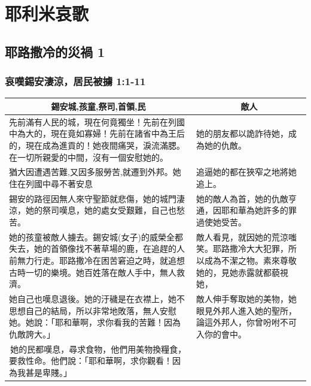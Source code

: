 \chapter{耶利米哀歌}

\section{耶路撒冷的災禍 1}
\subsection{哀嘆錫安淒涼，居民被擄 1:1-11}

\begin{table}[H]
\centering
\begin{tabular}{p{}|p{6.25cm}}\hline\hline
\multicolumn{1}{c|}{錫安城,孩童,祭司,首領,民}&\multicolumn{1}{c}{敵人}\\\hline
先前滿有人民的城，現在何竟獨坐！先前在列國中為大的，現在竟如寡婦！先前在諸省中為王后的，現在成為進貢的！她夜間痛哭，淚流滿腮。在一切所親愛的中間，沒有一個安慰她的。
&她的朋友都以詭詐待她，成為她的仇敵。\\\hline

猶大因遭遇苦難,又因多服勞苦,就遷到外邦。她住在列國中尋不著安息
&追逼她的都在狹窄之地將她追上。\\\hline

錫安的路徑因無人來守聖節就悲傷，她的城門淒涼，她的祭司嘆息，她的處女受艱難，自己也愁苦。
&她的敵人為首，她的仇敵亨通，因耶和華為她許多的罪過使她受苦。\\\hline

她的孩童被敵人擄去。錫安城(女子)的威榮全都失去，她的首領像找不著草場的鹿，在追趕的人前無力行走。耶路撒冷在困苦窘迫之時，就追想古時一切的樂境。她百姓落在敵人手中，無人救濟。
&敵人看見，就因她的荒涼嗤笑。耶路撒冷大大犯罪，所以成為不潔之物。素來尊敬她的，見她赤露就都藐視她，\\\hline

她自己也嘆息退後。她的汙穢是在衣襟上，她不思想自己的結局，所以非常地敗落，無人安慰她。她說：「耶和華啊，求你看我的苦難！因為仇敵誇大。」&敵人伸手奪取她的美物，她眼見外邦人進入她的聖所，論這外邦人，你曾吩咐不可入你的會中。 \\\hline

 她的民都嘆息，尋求食物，他們用美物換糧食，要救性命。他們說：「耶和華啊，求你觀看！因為我甚是卑賤。」&\\\hline
\end{tabular}
\end{table}

